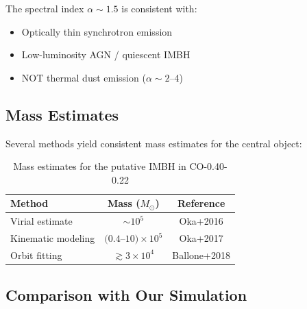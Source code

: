 \documentclass[twocolumn,amsmath,amssymb,prd,superscriptaddress,nofootinbib]{revtex4-2}
\begin{document}
The spectral index $\alpha \sim 1.5$ is consistent with:
\begin{itemize}
    \item Optically thin synchrotron emission
    \item Low-luminosity AGN / quiescent IMBH
    \item NOT thermal dust emission ($\alpha \sim 2$--4)
\end{itemize}

\subsection{Mass Estimates}

Several methods yield consistent mass estimates for the central object:

\begin{table}[h]
\centering
\caption{Mass estimates for the putative IMBH in CO-0.40-0.22}
\label{tab:mass_est}
\begin{tabular}{lcc}
\toprule
Method & Mass ($M_\odot$) & Reference \\
\midrule
Virial estimate & $\sim 10^5$ & Oka+2016 \\
Kinematic modeling & $(0.4$--$10) \times 10^5$ & Oka+2017 \\
Orbit fitting & $\gtrsim 3 \times 10^4$ & Ballone+2018 \\
\bottomrule
\end{tabular}
\end{table}

\subsection{Comparison with Our Simulation}
\end{document}
